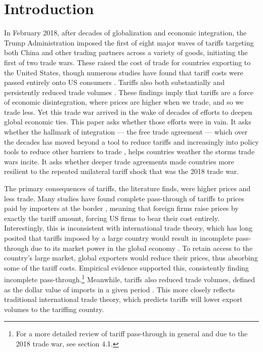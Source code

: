 \section{Introduction}

In February 2018, after decades of globalization and economic integration, the Trump Administration imposed the first of eight major waves of tariffs targeting both China and other trading partners across a variety of goods, initiating the first of two trade wars. These raised the cost of trade for countries exporting to the United States, though numerous studies have found that tariff costs were passed entirely onto US consumers \autocite{fajgelbaumEconomicImpactsUS2022}. Tariffs also both substantially and persistently reduced trade volumes \autocite{amiti_whos_2020}. These findings imply that tariffs are a force of economic disintegration, where prices are higher when we trade, and so we trade less. Yet this trade war arrived in the wake of decades of efforts to deepen global economic ties. This paper asks whether those efforts were in vain. It asks whether the hallmark of integration --- the free trade agreement --- which over the decades has moved beyond a tool to reduce tariffs and increasingly into policy tools to reduce other barriers to trade \autocite{hofmann2017}, helps countries weather the storms trade wars incite. It asks whether deeper trade agreements made countries more resilient to the repeated unilateral tariff shock that was the 2018 trade war. 

The primary consequences of tariffs, the literature finds, were higher prices and less trade. Many studies have found complete pass-through of tariffs to prices paid by importers at the border \autocite{amiti_whos_2020, fajgelbaum2020, cavalloTariffPassThroughBorder2021}, meaning that foreign firms raise prices by exactly the tariff amount, forcing US firms to bear their cost entirely. Interestingly, this is inconsistent with international trade theory, which has long posited that tariffs imposed by a large country would result in incomplete pass-through due to its market power in the global economy \autocite{fajgelbaumEconomicImpactsUS2022}. To retain access to the country's large market, global exporters would reduce their prices, thus absorbing some of the tariff costs. Empirical evidence supported this, consistently finding incomplete pass-through.\footnote{For a more detailed review of tariff pass-through in general and due to the 2018 trade war, see \autocite{fajgelbaumEconomicImpactsUS2022} section 4.1.} Meanwhile, tariffs also reduced trade volumes, defined as the dollar value of imports in a given period \autocite{fajgelbaum2020, amiti2019_tariffs, amiti_whos_2020}. This more closely reflects traditional international trade theory, which predicts tariffs will lower export volumes to the tariffing country. 

